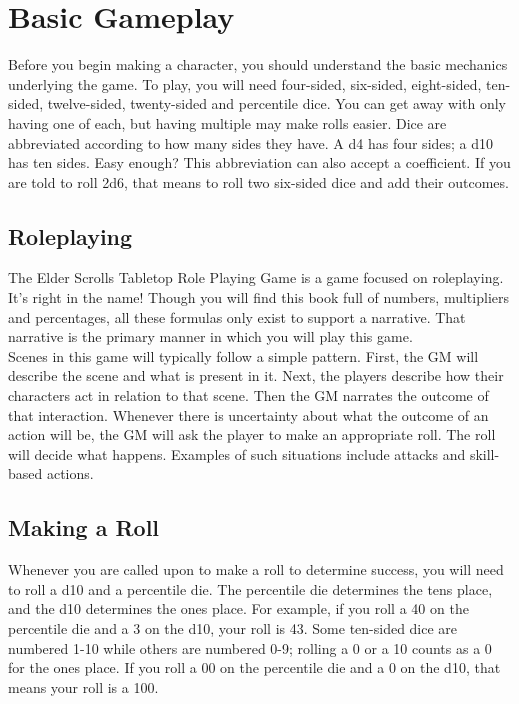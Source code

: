 \chapter{Basic Gameplay}
Before you begin making a character, you should understand the basic mechanics underlying the game. To play, you will need four-sided, six-sided, eight-sided, ten-sided, twelve-sided, twenty-sided and percentile dice. You can get away with only having one of each, but having multiple may make rolls easier. Dice are abbreviated according to how many sides they have. A d4 has four sides; a d10 has ten sides. Easy enough? This abbreviation can also accept a coefficient. If you are told to roll 2d6, that means to roll two six-sided dice and add their outcomes.

\section{Roleplaying}
The Elder Scrolls Tabletop Role Playing Game is a game focused on roleplaying. It's right in the name! Though you will find this book full of numbers, multipliers and percentages, all these formulas only exist to support a narrative. That narrative is the primary manner in which you will play this game.\\

Scenes in this game will typically follow a simple pattern. First, the GM will describe the scene and what is present in it. Next, the players describe how their characters act in relation to that scene. Then the GM narrates the outcome of that interaction. Whenever there is uncertainty about what the outcome of an action will be, the GM will ask the player to make an appropriate roll. The roll will decide what happens. Examples of such situations include attacks and skill-based actions.

\section{Making a Roll}
Whenever you are called upon to make a roll to determine success, you will need to roll a d10 and a percentile die. The percentile die determines the tens place, and the d10 determines the ones place. For example, if you roll a 40 on the percentile die and a 3 on the d10, your roll is 43. Some ten-sided dice are numbered 1-10 while others are numbered 0-9; rolling a 0 or a 10 counts as a 0 for the ones place. If you roll a 00 on the percentile die and a 0 on the d10, that means your roll is a 100.\\

